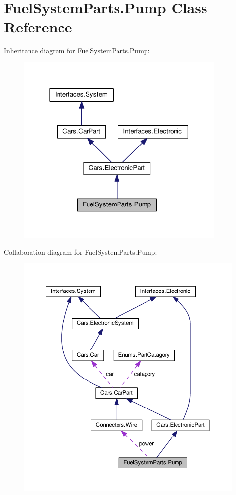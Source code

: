 \hypertarget{classFuelSystemParts_1_1Pump}{}\section{Fuel\+System\+Parts.\+Pump Class Reference}
\label{classFuelSystemParts_1_1Pump}


Inheritance diagram for Fuel\+System\+Parts.\+Pump\+:\nopagebreak
\begin{figure}[H]
\begin{center}
\leavevmode
\includegraphics[width=291pt]{classFuelSystemParts_1_1Pump__inherit__graph}
\end{center}
\end{figure}


Collaboration diagram for Fuel\+System\+Parts.\+Pump\+:\nopagebreak
\begin{figure}[H]
\begin{center}
\leavevmode
\includegraphics[width=350pt]{classFuelSystemParts_1_1Pump__coll__graph}
\end{center}
\end{figure}
